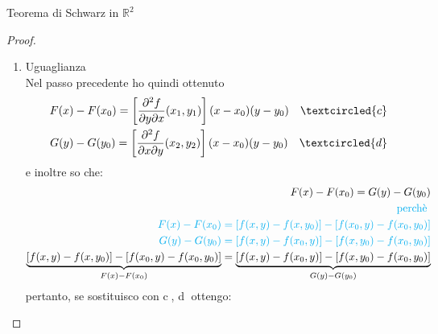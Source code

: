 \documentclass{article}  %
\begin{document}
\begin{theorem}{Teorema di Schwarz in $\mathbb{R}^2$}
\begin{proof}
\begin{enumerate}
\begin{itemize}
				            Adesso sostituisco \textcircled{b} in \textcircled{a}, ottenendo:
				            \begin{align*}
					            (x-x_0)\left[\textcolor{red}{(y-y_0)\frac{\partial^2 f}{\partial y \partial x}(x_1,y_1)}\right]=F(x)-F(x_0) \\
					            F(x)-F(x_0)=\left[\frac{\partial^2 f}{\partial y \partial x}(x_1,y_1)\right](x-x_0)(y-y_0)
				            \end{align*}
				      \item \textcolor{red}{applico Lagrange a $G(y)$} \\
				            Ragionamento analogo con $G(y)$, dove, applicando due volte Lagrange ottengo:
				            \begin{align*}
					            G(y)-G(y_0)=\left[ \frac{\partial^2f}{\partial x \partial y}(x_2,y_2) \right](x-x_0)(y-y_0)
				            \end{align*}
			      \end{itemize}
			\item Uguaglianza \\
			      Nel passo precedente ho quindi ottenuto
			      \begin{align*}
				      F(x)-F(x_0)=\left[\frac{\partial^2 f}{\partial y \partial x}(x_1,y_1)\right](x-x_0)(y-y_0) \quad \textcircled{c} \\
				      G(y)-G(y_0)=\left[ \frac{\partial^2f}{\partial x \partial y}(x_2,y_2) \right](x-x_0)(y-y_0) \quad \textcircled{d}
			      \end{align*}
			      e inoltre so che:
			      \begin{align*}
				      F(x)-F(x_0) = G(y)-G(y_0)                                                                       \\
				      \textcolor{cyan}{\text{perchè }}                                                                \\
				      \textcolor{cyan}{F(x)-F(x_0) = \left[f(x,y)-f(x,y_0)\right] - \left[f(x_0,y)-f(x_0,y_0)\right]} \\
				      \textcolor{cyan}{G(y)-G(y_0) = \left[f(x,y)-f(x_0,y)\right] - \left[f(x,y_0)-f(x_0,y_0)\right]} \\
				      \underbrace{\left[f(x,y)-f(x,y_0)\right] - \left[f(x_0,y)-f(x_0,y_0)\right]}_{F(x)-F(x_0)} = \underbrace{\left[f(x,y)-f(x_0,y)\right] - \left[f(x,y_0)-f(x_0,y_0)\right]}_{G(y)-G(y_0)}
			      \end{align*}
			      pertanto, se sostituisco con \textcircled{c}, \textcircled{d} ottengo:

\end{enumerate}
\end{proof}
\end{theorem}
\end{document}
